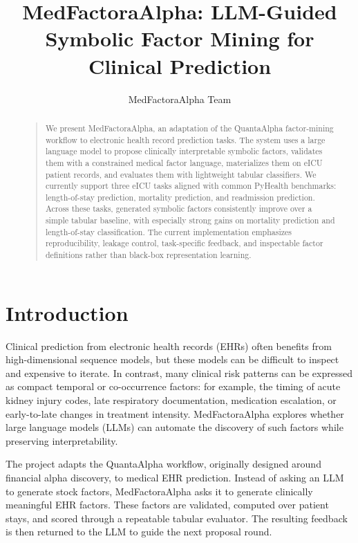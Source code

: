 \documentclass[letterpaper]{article}
\title{MedFactoraAlpha: LLM-Guided Symbolic Factor Mining for Clinical Prediction}
\author{
MedFactoraAlpha Team\\
}
\begin{document}
\maketitle

\begin{abstract}
\begin{quote}
We present MedFactoraAlpha, an adaptation of the QuantaAlpha factor-mining workflow to electronic health record prediction tasks. The system uses a large language model to propose clinically interpretable symbolic factors, validates them with a constrained medical factor language, materializes them on eICU patient records, and evaluates them with lightweight tabular classifiers. We currently support three eICU tasks aligned with common PyHealth benchmarks: length-of-stay prediction, mortality prediction, and readmission prediction. Across these tasks, generated symbolic factors consistently improve over a simple tabular baseline, with especially strong gains on mortality prediction and length-of-stay classification. The current implementation emphasizes reproducibility, leakage control, task-specific feedback, and inspectable factor definitions rather than black-box representation learning.
\end{quote}
\end{abstract}

\section{Introduction}

Clinical prediction from electronic health records (EHRs) often benefits from high-dimensional sequence models, but these models can be difficult to inspect and expensive to iterate. In contrast, many clinical risk patterns can be expressed as compact temporal or co-occurrence factors: for example, the timing of acute kidney injury codes, late respiratory documentation, medication escalation, or early-to-late changes in treatment intensity. MedFactoraAlpha explores whether large language models (LLMs) can automate the discovery of such factors while preserving interpretability.

The project adapts the QuantaAlpha workflow, originally designed around financial alpha discovery, to medical EHR prediction. Instead of asking an LLM to generate stock factors, MedFactoraAlpha asks it to generate clinically meaningful EHR factors. These factors are validated, computed over patient stays, and scored through a repeatable tabular evaluator. The resulting feedback is then returned to the LLM to guide the next proposal round.
\end{document}
